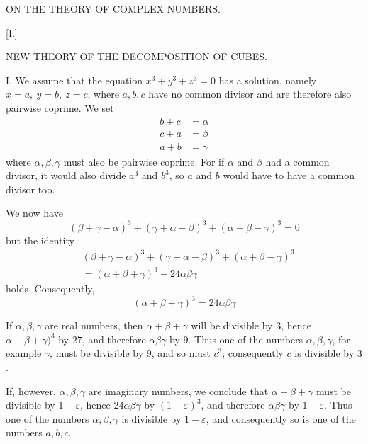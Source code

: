 %
%
\clearpage
\renewcommand{\BookRunningTitle}{On the Theory of Complex Numbers}
\begin{center}\Large ON THE THEORY OF COMPLEX NUMBERS.\end{center}
\begin{center}[I.]\par\medskip\large NEW THEORY OF THE DECOMPOSITION OF CUBES.\end{center}

I. We assume that the equation $x^3+y^3+z^3=0$ has a solution, namely $x=a,\ y=b,\ z=c$, where $a,b,c$ have no common divisor and are therefore also pairwise coprime. We set
\[
\begin{aligned}
b+c&=\alpha\\
c+a&=\beta\\
a+b&=\gamma
\end{aligned}
\]
where $\alpha,\beta,\gamma$ must also be pairwise coprime. For if $\alpha$ and $\beta$ had a common divisor, it would also divide $a^3$ and $b^3$, so $a$ and $b$ would have to have a common divisor too.

We now have
\[
(\beta+\gamma-\alpha)^3+(\gamma+\alpha-\beta)^3+(\alpha+\beta-\gamma)^3=0
\]
but the identity
\[
\begin{aligned}
&(\beta+\gamma-\alpha)^3+(\gamma+\alpha-\beta)^3+(\alpha+\beta-\gamma)^3\\
&=(\alpha+\beta+\gamma)^3-24\alpha\beta\gamma
\end{aligned}
\]
holds. Consequently,
\[
(\alpha+\beta+\gamma)^3=24\alpha\beta\gamma
\]

%
If $\alpha,\beta,\gamma$ are real numbers, then $\alpha+\beta+\gamma$ will be divisible by $3$, hence $\alpha+\beta+\gamma)^3$ by $27$, and therefore $\alpha\beta\gamma$ by $9$. Thus one of the numbers $\alpha,\beta,\gamma$, for example $\gamma$, must be divisible by $9$, and so must $c^3$; consequently $c$ is divisible by $3$.

If, however, $\alpha,\beta,\gamma$ are imaginary numbers, we conclude that $\alpha+\beta+\gamma$ must be divisible by $1-\varepsilon$, hence $24\alpha\beta\gamma$ by $(1-\varepsilon)^3$, and therefore $\alpha\beta\gamma$ by $1-\varepsilon$. Thus one of the numbers $\alpha,\beta,\gamma$ is divisible by $1-\varepsilon$, and consequently so is one of the numbers $a,b,c$.

